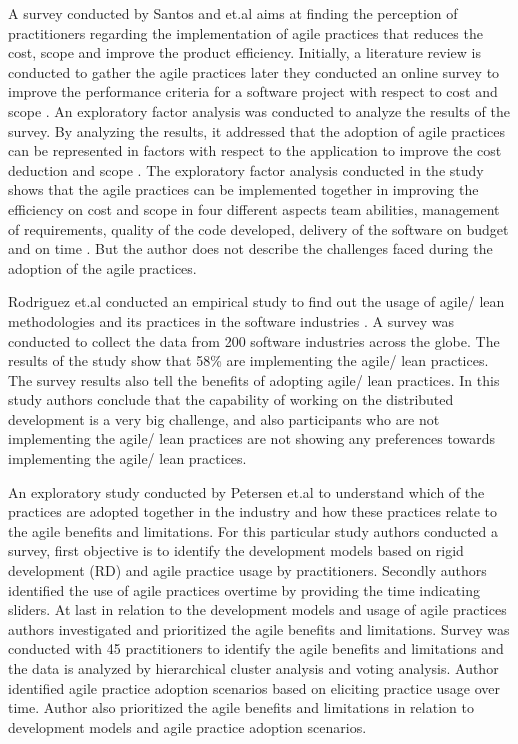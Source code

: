 \documentclass[a4paper,oneside]{bth}
\begin{document}
A survey conducted by Santos and et.al \cite{santos_improving_2013} aims at finding the perception of practitioners regarding the implementation of agile practices that reduces the cost, scope and improve the product efficiency. Initially, a literature review is conducted to gather the agile practices later they conducted an online survey to improve the performance criteria for a software project with respect to cost and scope \cite{santos_improving_2013}. An exploratory factor analysis was conducted to analyze the results of the survey. By analyzing the results, it addressed that the adoption of agile practices can be represented in factors with respect to the application to improve the cost deduction and scope \cite{santos_improving_2013}. The exploratory factor analysis conducted in the study shows that the agile practices can be implemented together in improving the efficiency on cost and scope in four different aspects team abilities, management of requirements, quality of the code developed, delivery of the software on budget and on time \cite{santos_improving_2013}. But the author does not describe the challenges faced during the adoption of the agile practices.

Rodriguez et.al conducted an empirical study to find out the usage of agile/ lean methodologies and its practices in the software industries \cite{rodriguez_survey_2012}. A survey was conducted to collect the data from 200 software industries across the globe. The results of the study show that 58\% are implementing the agile/ lean practices. The survey results also tell the benefits of adopting agile/ lean practices. In this study authors conclude that the capability of working on the distributed development is a very big challenge, and also participants who are not implementing the agile/ lean practices are not showing any preferences towards implementing the agile/ lean practices.

An exploratory study conducted by Petersen et.al \cite{solinski_prioritizing_2014}  to understand which of the practices are adopted together in the industry and how these practices relate to the agile benefits and limitations. For this particular study authors conducted a survey, first objective is to identify the development models based on rigid development (RD) and agile practice usage by practitioners. Secondly authors identified the use of agile practices overtime by providing the time indicating sliders. At last in relation to the development models and usage of agile practices authors investigated and prioritized the agile benefits and limitations. Survey was conducted with 45 practitioners to identify the agile benefits and limitations and the data is analyzed by hierarchical cluster analysis and voting analysis. Author identified agile practice adoption scenarios based on eliciting practice usage over time. Author also prioritized the agile benefits and limitations in relation to development models and agile practice adoption scenarios. 
\end{document}
